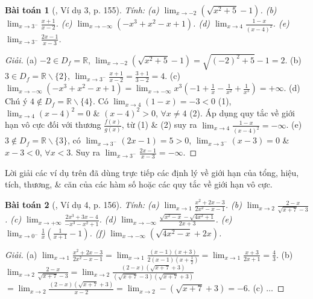 \documentclass{article}
\newtheorem{baitoan}{Bài toán}
\begin{document}
\begin{baitoan}[\cite{SBT_Toan_11_dai_so_giai_tich_co_ban}, Ví dụ 3, p. 155]
	Tính: (a) $\lim_{x\to-2} \left(\sqrt{x^2 + 5} - 1\right)$. (b) $\lim_{x\to3^-} \frac{x + 1}{x - 2}$. (c) $\lim_{x\to-\infty} (-x^3 + x^2 - x + 1)$. (d) $\lim_{x\to4} \frac{1 - x}{(x - 4)^2}$. (e) $\lim_{x\to3^-} \frac{2x - 1}{x - 3}$.
\end{baitoan}

\begin{proof}[Giải]
	(a) $-2\in D_f = \mathbb{R}$, $\lim_{x\to-2} \left(\sqrt{x^2 + 5} - 1\right) = \sqrt{(-2)^2 + 5} - 1 = 2$. (b) $3\in D_f = \mathbb{R}\backslash\{2\}$, $\lim_{x\to3^-} \frac{x + 1}{x - 2} = \frac{3 + 1}{3 - 2} = 4$. (c) $\lim_{x\to-\infty} (-x^3 + x^2 - x + 1) = \lim_{x\to-\infty} x^3\left(-1 + \frac{1}{x} - \frac{1}{x^2} + \frac{1}{x^3}\right) = +\infty$. (d) Chú ý $4\notin D_f = \mathbb{R}\backslash\{4\}$. Có $\lim_{x\to4} (1 - x) = -3 < 0$ (1), $\lim_{x\to4} (x - 4)^2 = 0$ \& $(x - 4)^2 > 0$, $\forall x\ne4$ (2). Áp dụng quy tắc về giới hạn vô cực đối với thương $\frac{f(x)}{g(x)}$, từ (1) \& (2) suy ra  $\lim_{x\to4} \frac{1 - x}{(x - 4)^2} = -\infty$. (e) $3\notin D_f = \mathbb{R}\backslash\{3\}$, có $\lim_{x\to3^-} (2x - 1) = 5 > 0$, $\lim_{x\to3^-} (x - 3) = 0$ \& $x - 3 < 0$, $\forall x < 3$. Suy ra $\lim_{x\to3^-} \frac{2x - 1}{x - 3} = -\infty$.
\end{proof}
Lời giải các ví dụ  trên đã dùng trực tiếp các định lý về giới hạn của tổng, hiệu, tích, thương, \& căn của các hàm số hoặc các quy tắc về giới hạn vô cực.

\begin{baitoan}[\cite{SBT_Toan_11_dai_so_giai_tich_co_ban}, Ví dụ 4, p. 156]
	Tính: (a) $\lim_{x\to1} \frac{x^2 + 2x - 3}{2x^2 - x - 1}$. (b) $\lim_{x\to2} \frac{2 - x}{\sqrt{x + 7} - 3}$. (c) $\lim_{x\to+\infty} \frac{2x^3 + 3x - 4}{-x^3 - x^2 + 1}$. (d) $\lim_{x\to-\infty} \frac{\sqrt{x^2 - x} - \sqrt{4x^2 + 1}}{2x + 3}$. (e) $\lim_{x\to0^-} \frac{1}{x}\left(\frac{1}{x + 1} - 1\right)$. (f) $\lim_{x\to-\infty} \left(\sqrt{4x^2 - x} + 2x\right)$.
\end{baitoan}

\begin{proof}[Giải]
	(a) $\lim_{x\to1} \frac{x^2 + 2x - 3}{2x^2 - x - 1} = \lim_{x\to1} \frac{(x - 1)(x + 3)}{2(x - 1)\left(x + \frac{1}{2}\right)} = \lim_{x\to1} \frac{x + 3}{2x + 1} = \frac{4}{3}$. (b) $\lim_{x\to2} \frac{2 - x}{\sqrt{x + 7} - 3} = \lim_{x\to2} \frac{(2 - x)(\sqrt{x + 7} + 3)}{(\sqrt{x + 7} - 3)(\sqrt{x + 7} + 3)}$\\$= \lim_{x\to2} \frac{(2 - x)(\sqrt{x + 7} + 3)}{x - 2} = \lim_{x\to2} -(\sqrt{x + 7} + 3) = -6$. (c) $\ldots$ 
\end{proof}
\end{document}
